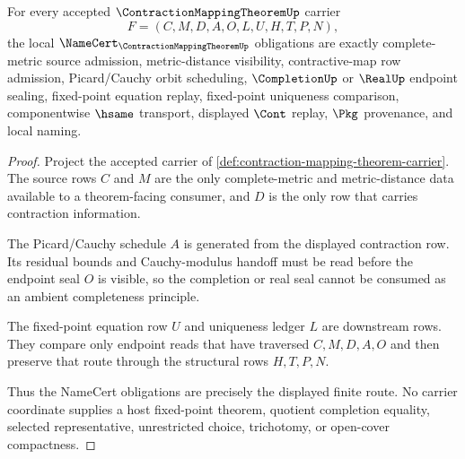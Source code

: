 \begin{theorem}
\label{thm:contraction-mapping-theorem-namecert-obligations}
For every accepted $\ContractionMappingTheoremUp$ carrier
$$
F=(C,M,D,A,O,L,U,H,T,P,N),
$$
the local $\NameCert_{\ContractionMappingTheoremUp}$ obligations are exactly complete-metric source admission, metric-distance visibility, contractive-map row admission, Picard/Cauchy orbit scheduling, $\CompletionUp$ or $\RealUp$ endpoint sealing, fixed-point equation replay, fixed-point uniqueness comparison, componentwise $\hsame$ transport, displayed $\Cont$ replay, $\Pkg$ provenance, and local naming.
\end{theorem}
\begin{proof}
Project the accepted carrier of \autoref{def:contraction-mapping-theorem-carrier}. The source rows $C$ and $M$ are the only complete-metric and metric-distance data available to a theorem-facing consumer, and $D$ is the only row that carries contraction information.

The Picard/Cauchy schedule $A$ is generated from the displayed contraction row. Its residual bounds and Cauchy-modulus handoff must be read before the endpoint seal $O$ is visible, so the completion or real seal cannot be consumed as an ambient completeness principle.

The fixed-point equation row $U$ and uniqueness ledger $L$ are downstream rows. They compare only endpoint reads that have traversed $C,M,D,A,O$ and then preserve that route through the structural rows $H,T,P,N$.

Thus the NameCert obligations are precisely the displayed finite route. No carrier coordinate supplies a host fixed-point theorem, quotient completion equality, selected representative, unrestricted choice, trichotomy, or open-cover compactness.
\end{proof}



